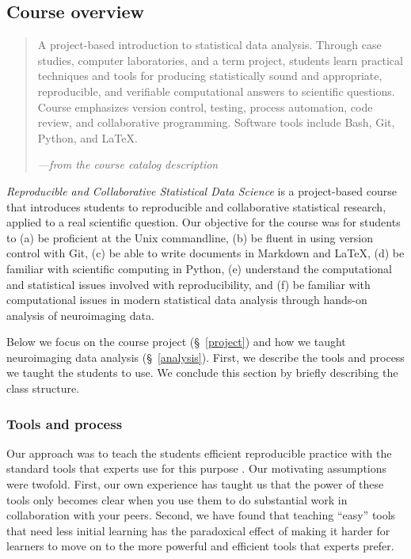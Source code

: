 \subsection{Course overview}

\begin{quote}
A project-based introduction to statistical data analysis. Through case
studies, computer laboratories, and a term project, students learn
practical techniques and tools for producing statistically sound and
appropriate, reproducible, and verifiable computational answers to
scientific questions. Course emphasizes version control, testing,
process automation, code review, and collaborative programming.
Software tools include Bash, Git, Python, and \LaTeX.

\hfill\emph{---from the course catalog description}
\end{quote}

\emph{Reproducible and Collaborative Statistical Data Science} is a
project-based course that introduces students to reproducible and collaborative
statistical research, applied to a real scientific question.
Our objective for the course was for students to
(a) be proficient at the Unix commandline,
(b) be fluent in using version control with Git,
(c) be able to write documents in Markdown and \LaTeX,
(d) be familiar with scientific computing in Python,
(e) understand the computational and statistical issues involved with reproducibility, and
(f) be familiar with computational issues in modern statistical data
analysis through hands-on analysis of neuroimaging data.

Below we focus on the course project (\S~\ref{project}) and
how we taught neuroimaging data analysis (\S~\ref{analysis}).
First, we describe the tools and process we taught the students to use.
We conclude this section by briefly describing the class structure.

\subsubsection{Tools and process}

Our approach was to teach the students efficient reproducible practice with the
standard tools that experts use for this purpose \citep{millman2014developing}.
Our motivating assumptions were twofold.  First, our own experience has taught
us that the power of these tools only becomes clear when you use them to do
substantial work in collaboration with your peers.  Second, we have found that
teaching ``easy'' tools that need less initial learning has the paradoxical
effect of making it harder for learners to move on to the more powerful and
efficient tools that experts prefer.

